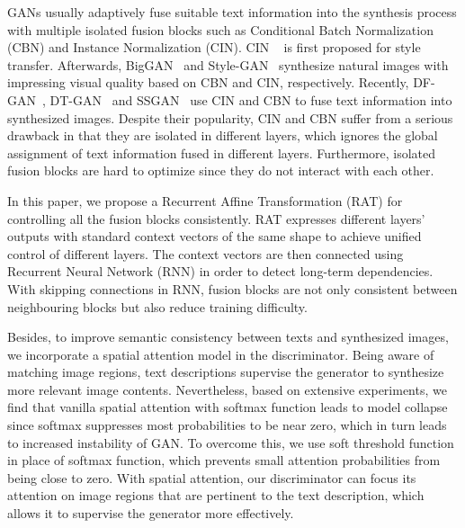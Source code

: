 \documentclass{article}
\begin{document}
	GANs usually adaptively fuse suitable text information into the synthesis process with multiple isolated fusion blocks such as Conditional Batch Normalization (CBN) and Instance Normalization (CIN). CIN ~\cite{DBLP:conf/iclr/DumoulinSK17} is first proposed for style transfer. Afterwards, BigGAN~\cite{DBLP:conf/iclr/BrockDS19} and Style-GAN~\cite{DBLP:journals/pami/KarrasLA21} synthesize natural images with impressing visual quality based on CBN and CIN, respectively. Recently, 	DF-GAN~\cite{DBLP:journals/corr/abs-2008-05865}, DT-GAN~\cite{DBLP:conf/ijcnn/ZhangS21} and SSGAN~\cite{DBLP:journals/corr/abs-2104-00567} use CIN and CBN to fuse text information into synthesized images.
    Despite their popularity, CIN and CBN suffer from a serious drawback in that they are isolated in different layers, which ignores the global assignment of text information fused in different layers. Furthermore, isolated fusion blocks are hard to optimize since they do not interact with each other.
    

    In this paper, we propose a Recurrent Affine Transformation (RAT) for controlling all the fusion blocks consistently. RAT  expresses different layers' outputs with standard context vectors of the same shape to achieve unified control of different layers. The context vectors are then connected using Recurrent Neural Network (RNN) in order to detect long-term dependencies. With skipping connections in RNN, fusion blocks are not only consistent between neighbouring blocks but also reduce training difficulty.

Besides, to improve semantic consistency between texts and synthesized images, we incorporate a spatial attention model in the discriminator.	Being aware of matching image regions, text descriptions supervise the generator to synthesize more relevant image contents. Nevertheless, based on extensive experiments, we find that vanilla spatial attention with softmax function leads to model collapse since softmax suppresses most probabilities to be near zero, which in turn leads to increased instability of GAN. To overcome this, we use soft threshold function in place of softmax function, which prevents small attention probabilities from being close to zero. With spatial attention, our discriminator can focus its attention on image regions that are pertinent to the text description, which allows it to supervise the generator more effectively.
		
\end{document}
